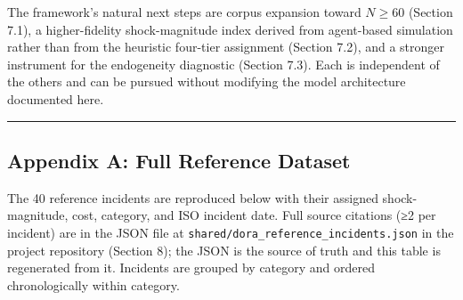 \documentclass[
]{article}
\begin{document}
The framework's natural next steps are corpus expansion toward
\(N \geq 60\) (Section 7.1), a higher-fidelity shock-magnitude index
derived from agent-based simulation rather than from the heuristic
four-tier assignment (Section 7.2), and a stronger instrument for the
endogeneity diagnostic (Section 7.3). Each is independent of the others
and can be pursued without modifying the model architecture documented
here.

\begin{center}\rule{0.5\linewidth}{0.5pt}\end{center}

\subsection{Appendix A: Full Reference
Dataset}\label{appendix-a-full-reference-dataset}

The 40 reference incidents are reproduced below with their assigned
shock-magnitude, cost, category, and ISO incident date. Full source
citations (≥2 per incident) are in the JSON file at
\texttt{shared/dora\_reference\_incidents.json} in the project
repository (Section 8); the JSON is the source of truth and this table
is regenerated from it. Incidents are grouped by category and ordered
chronologically within category.
\end{document}
